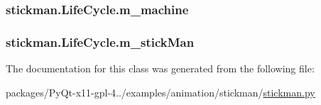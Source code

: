 \subsubsection[{m\+\_\+machine}]{\setlength{\rightskip}{0pt plus 5cm}stickman.\+Life\+Cycle.\+m\+\_\+machine}\label{classstickman_1_1LifeCycle_ad82e480b6b7cc709c387611fde28fa9c}
\hypertarget{classstickman_1_1LifeCycle_a3e1ad1451ec70ad025ec32862a83bf69}{}
\subsubsection[{m\+\_\+stick\+Man}]{\setlength{\rightskip}{0pt plus 5cm}stickman.\+Life\+Cycle.\+m\+\_\+stick\+Man}\label{classstickman_1_1LifeCycle_a3e1ad1451ec70ad025ec32862a83bf69}


The documentation for this class was generated from the following file\+:\begin{DoxyCompactItemize}
\item 
packages/\+Py\+Qt-\/x11-\/gpl-\/4../examples/animation/stickman/\hyperlink{stickman_8py}{stickman.\+py}\end{DoxyCompactItemize}
